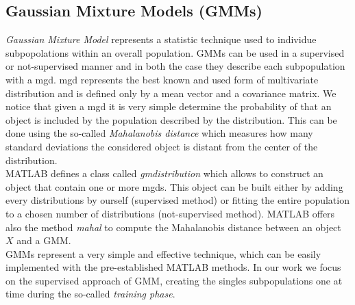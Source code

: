 \subsection{Gaussian Mixture Models (GMMs)}
\label{subsec:gmm}

\textit{Gaussian Mixture Model} represents a statistic technique used to individue subpopolations within an overall population. GMMs can be used in a supervised or not-supervised manner and in both the case they describe each subpopulation with a \gls{mgd}.  \gls{mgd} represents the best known and used form of multivariate distribution and is defined only by a mean vector and a covariance matrix. We notice that given a \gls{mgd} it is very simple determine the probability of that an object is included by the population described by the distribution. This can be done using the so-called \textit{Mahalanobis distance} which measures how many standard deviations the considered object is distant from the center of the distribution. \\
%
MATLAB defines a class called \textit{gmdistribution} which allows to construct an object that contain one or more \gls{mgd}s. This object can be built either by adding every distributions by ourself (supervised method) or fitting the entire population to a chosen number of distributions (not-supervised method). MATLAB offers also the method \textit{mahal} to compute the Mahalanobis distance between an object $X$ and a GMM. \\
%
GMMs represent a very simple and effective technique, which can be easily implemented with the pre-established MATLAB methods. In our work we focus on the supervised approach of GMM, creating the singles subpopulations one at time during the so-called \textit{training phase}.
